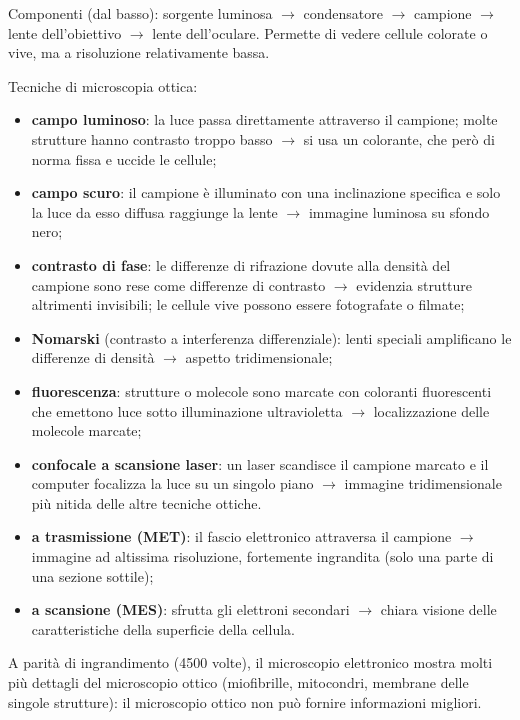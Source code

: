 Componenti (dal basso): sorgente luminosa $\rightarrow$ condensatore $\rightarrow$ campione $\rightarrow$ lente dell'obiettivo $\rightarrow$ lente dell'oculare. Permette di vedere cellule colorate o vive, ma a risoluzione relativamente bassa.

Tecniche di microscopia ottica:
\begin{itemize}
  \item \textbf{campo luminoso}: la luce passa direttamente attraverso il campione; molte strutture hanno contrasto troppo basso $\rightarrow$ si usa un colorante, che però di norma fissa e uccide le cellule;
  \item \textbf{campo scuro}: il campione è illuminato con una inclinazione specifica e solo la luce da esso diffusa raggiunge la lente $\rightarrow$ immagine luminosa su sfondo nero;
  \item \textbf{contrasto di fase}: le differenze di rifrazione dovute alla densità del campione sono rese come differenze di contrasto $\rightarrow$ evidenzia strutture altrimenti invisibili; le cellule vive possono essere fotografate o filmate;
  \item \textbf{Nomarski} (contrasto a interferenza differenziale): lenti speciali amplificano le differenze di densità $\rightarrow$ aspetto tridimensionale;
  \item \textbf{fluorescenza}: strutture o molecole sono marcate con coloranti fluorescenti che emettono luce sotto illuminazione ultravioletta $\rightarrow$ localizzazione delle molecole marcate;
  \item \textbf{confocale a scansione laser}: un laser scandisce il campione marcato e il computer focalizza la luce su un singolo piano $\rightarrow$ immagine tridimensionale più nitida delle altre tecniche ottiche.
\end{itemize}

\begin{itemize}
  \item \textbf{a trasmissione (MET)}: il fascio elettronico attraversa il campione $\rightarrow$ immagine ad altissima risoluzione, fortemente ingrandita (solo una parte di una sezione sottile);
  \item \textbf{a scansione (MES)}: sfrutta gli elettroni secondari $\rightarrow$ chiara visione delle caratteristiche della superficie della cellula.
\end{itemize}
A parità di ingrandimento (4500 volte), il microscopio elettronico mostra molti più dettagli del microscopio ottico (miofibrille, mitocondri, membrane delle singole strutture): il microscopio ottico non può fornire informazioni migliori.
